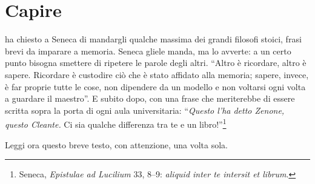 %
\chapter{Capire}
\label{cap:capire}


 ha chiesto a Seneca di mandargli qualche massima
dei grandi filosofi stoici, frasi brevi da imparare a memoria. Seneca
gliele manda, ma lo avverte: a un certo punto bisogna smettere di
ripetere le parole degli altri. \enquote{Altro è ricordare, altro è
sapere. Ricordare è custodire ciò che è stato affidato alla memoria;
sapere, invece, è far proprie tutte le cose, non dipendere da un
modello e non voltarsi ogni volta a guardare il maestro}. E subito
dopo, con una frase che meriterebbe di essere scritta sopra la porta di
ogni aula universitaria: \enquote{\emph{Questo l'ha detto Zenone,
questo Cleante.} Ci sia qualche differenza tra te e un
libro!}\footnote{Seneca, \emph{Epistulae ad Lucilium} 33, 8--9:
\emph{aliquid inter te intersit et librum}.}

Leggi ora questo breve testo, con attenzione, una volta sola.

